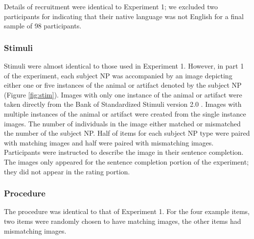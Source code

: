 \documentclass[10pt,letterpaper]{article}
\begin{document}
Details of recruitment were identical to Experiment 1; we excluded two participants for indicating that their native language was not English for a final sample of 98 participants.

\subsubsection{Stimuli} 

Stimuli were almost identical to those used in Experiment 1. However, in part 1 of the experiment, each subject NP was accompanied by an image depicting either one or five instances of the animal or artifact denoted by the subject NP (Figure \ref{fig:stim}). Images with only one instance of the animal or artifact were taken directly from the Bank of Standardized Stimuli version 2.0 \cite{Brodeur:2014}. Images with multiple instances of the animal or artifact were created from the single instance images. The number of individuals in the image either matched or mismatched the number of the subject NP. Half of items for each subject NP type were paired with matching images and half were paired with mismatching images. Participants were instructed to describe the image in their sentence completion. The images only appeared for the sentence completion portion of the experiment; they did not appear in the rating portion.

\subsubsection{Procedure} 

The procedure was identical to that of Experiment 1. For the four example items, two items were randomly chosen to have matching images, the other items had mismatching images.

\end{document}
